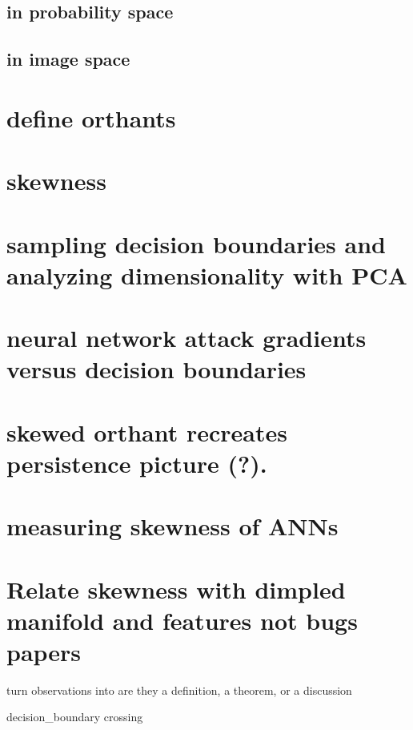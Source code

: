 \subsection{in probability space}
\subsection{in image space}
\section{define orthants}
\section{skewness}

\section{sampling decision boundaries and analyzing dimensionality
with PCA}

\section{neural network attack gradients versus decision boundaries}

\section{skewed orthant recreates persistence picture (?). }
\section{measuring skewness of ANNs}
\section{Relate skewness with dimpled manifold and features not bugs papers}


turn observations into are they a definition, a theorem, or a discussion

decision\_boundary crossing

